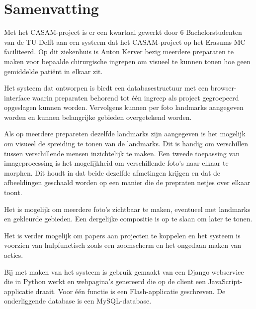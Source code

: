 \section{Samenvatting}

Met het CASAM-project is er een kwartaal gewerkt door 6 Bachelorstudenten van de TU-Delft aan een systeem dat het CASAM-project op het Erasums MC faciliteerd. Op dit ziekenhuis is Anton Kerver bezig meerdere preparaten te maken voor bepaalde chirurgische ingrepen om visueel te kunnen tonen hoe geen gemiddelde pati\"ent in elkaar zit.

Het systeem dat ontworpen is biedt een databasestructuur met een browser-interface waarin preparaten behorend tot \'e\'en ingreep als project gegroepeerd opgeslagen kunnen worden. Vervolgens kunnen per foto landmarks aangegeven worden en kunnen belangrijke gebieden overgetekend worden.

Als op meerdere prepareten dezelfde landmarks zijn aangegeven is het mogelijk om visueel de spreiding te tonen van de landmarks. Dit is handig om verschillen tussen verschillende mensen inzichtelijk te maken. Een tweede toepassing van imageprocessing is het mogelijkheid om verschillende foto's naar elkaar te morphen. Dit houdt in dat beide dezelfde afmetingen krijgen en dat de afbeeldingen geschaald worden op een manier die de prepraten netjes over elkaar toont.

Het is mogelijk om meerdere foto's zichtbaar te maken, eventueel met landmarks en gekleurde gebieden. Een dergelijke compositie is op te slaan om later te tonen.

Het is verder mogelijk om papers aan projecten te koppelen en het systeem is voorzien van hulpfunctisch zoals een zoomscherm en het ongedaan maken van acties. 

Bij met maken van het systeem is gebruik gemaakt van een Django webservice die in Python werkt en webpagina's genereerd die op de client een JavaScript-applicatie draait. Voor \'e\'en functie is een Flash-applicatie geschreven. De onderliggende database is een MySQL-database.

